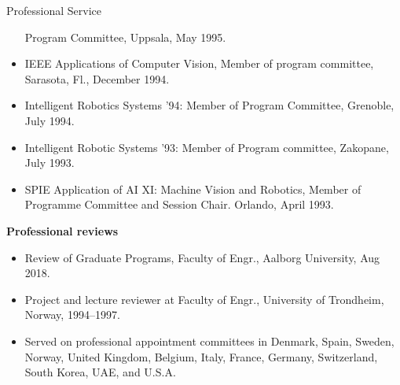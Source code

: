 \documentclass{article}
\begin{document}
\begin{cv}
\begin{cvlist}{Professional Service}
\begin{itemize}
    Program Committee, Uppsala, May 1995.
  \item IEEE Applications of Computer Vision, Member of program
    committee, Sarasota, Fl., December 1994.
  \item Intelligent Robotics Systems '94: Member of Program Committee,
    Grenoble, July 1994.
  \item Intelligent Robotic Systems '93: Member of Program committee,
    Zakopane, July 1993.
  \item SPIE Application of AI XI: Machine Vision and Robotics, Member
    of Programme Committee and Session Chair. Orlando, April 1993.
\end{itemize}

\item {\bf Professional reviews}
  \begin{itemize}
  \item Review of Graduate Programs, Faculty of Engr., Aalborg University, Aug 2018.
  \item Project and lecture reviewer at Faculty of Engr., University of Trondheim, Norway, 1994--1997.
  \item Served on professional appointment committees in Denmark,
    Spain, Sweden, Norway, United Kingdom, Belgium, Italy, France,
    Germany, Switzerland, South Korea, UAE, and U.S.A.
  \end{itemize}


\end{cvlist}
\end{cv}
\end{document}
